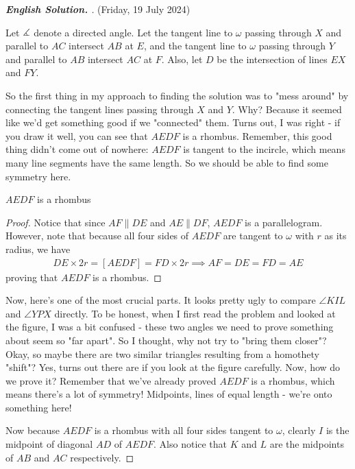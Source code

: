 \begin{proof}[\textbf{English Solution. }] (Friday, 19 July 2024) 
    
Let $\measuredangle$ denote a directed angle.
Let the tangent line to $\omega$ passing through $X$ and parallel to $AC$ intersect $AB$ at $E$, and the tangent line to $\omega$ passing through $Y$ and parallel to $AB$ intersect $AC$ at $F$. Also, let $D$ be the intersection of lines $EX$ and $FY$.
\begin{remark*}
    So the first thing in my approach to finding the solution was to "mess around" by connecting the tangent lines passing through $X$ and $Y$. Why? Because it seemed like we'd get something good if we "connected" them. Turns out, I was right - if you draw it well, you can see that $AEDF$ is a rhombus. Remember, this good thing didn't come out of nowhere: $AEDF$ is tangent to the incircle, which means many line segments have the same length. So we should be able to find some symmetry here.
\end{remark*}
\begin{lemmarev}
    $AEDF$ is a rhombus
    \begin{proof}
        Notice that since $AF \parallel DE$ and $AE \parallel DF$, $AEDF$ is a parallelogram. However, note that because all four sides of $AEDF$ are tangent to $\omega$ with $r$ as its radius, we have
        \begin{align*}
            DE \times 2r = [AEDF] = FD \times 2r \implies AF =DE = FD = AE 
        \end{align*}
        proving that $AEDF$ is a rhombus.
    \end{proof}
\end{lemmarev}
\begin{remark*}
    Now, here's one of the most crucial parts. It looks pretty ugly to compare $\angle KIL$ and $\angle YPX$ directly. To be honest, when I first read the problem and looked at the figure, I was a bit confused - these two angles we need to prove something about seem so "far apart". So I thought, why not try to "bring them closer"? Okay, so maybe there are two similar triangles resulting from a homothety "shift"? Yes, turns out there are if you look at the figure carefully. Now, how do we prove it? Remember that we've already proved $AEDF$ is a rhombus, which means there's a lot of symmetry! Midpoints, lines of equal length - we're onto something here!
\end{remark*}
Now because $AEDF$ is a rhombus with all four sides tangent to $\omega$, clearly $I$ is the midpoint of diagonal $AD$ of $AEDF$. Also notice that $K$ and $L$ are the midpoints of $AB$ and $AC$ respectively.

\end{proof}
